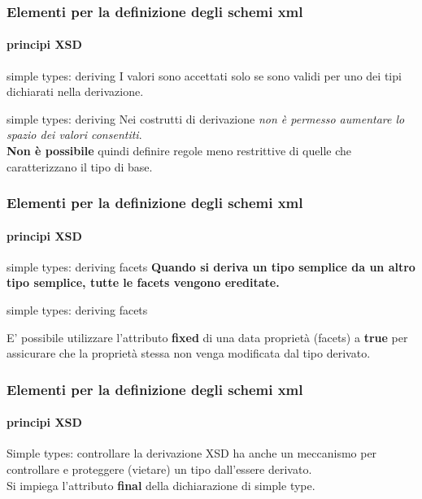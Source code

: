 

\begin{frame}
	\frametitle{Elementi per la definizione degli schemi xml}
	\framesubtitle{principi XSD}
	\addtocounter{nframe}{1}

	\begin{block}{simple types: deriving}
		I valori sono accettati solo se sono validi per uno dei tipi dichiarati nella derivazione.
	\end{block}

	\begin{block}{simple types: deriving}
		Nei costrutti di derivazione\textit{ non è permesso aumentare lo spazio dei valori consentiti}.
		\\\textbf{Non è possibile} quindi definire regole meno restrittive di quelle che caratterizzano il tipo di base.
	\end{block}
\end{frame}



\begin{frame}
	\frametitle{Elementi per la definizione degli schemi xml}
	\framesubtitle{principi XSD}
	\addtocounter{nframe}{1}

	\begin{block}{simple types: deriving facets}
		\textbf{Quando si deriva un tipo semplice da un altro tipo semplice, tutte le facets vengono ereditate.}
	\end{block}

	\begin{block}{simple types: deriving facets}
		
		E' possibile utilizzare l'attributo \textbf{fixed} di una data proprietà (facets) a \textbf{true} per assicurare che la proprietà stessa non venga modificata dal tipo derivato.
	\end{block}

\end{frame}


\begin{frame}
	\frametitle{Elementi per la definizione degli schemi xml}
	\framesubtitle{principi XSD}
	\addtocounter{nframe}{1}

	\begin{block}{Simple types: controllare la derivazione}
		XSD ha anche un meccanismo per controllare e proteggere (vietare) un tipo dall'essere derivato.
		\\ Si impiega l'attributo \textbf{final} della dichiarazione di simple type.
	\end{block}

\end{frame}

